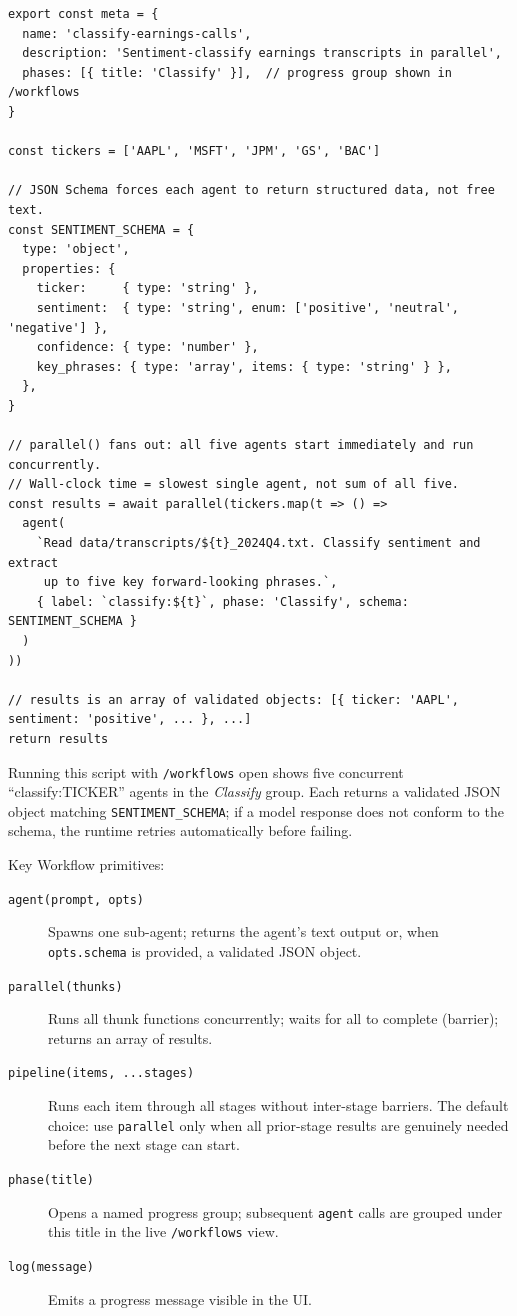 \begin{verbatim}
export const meta = {
  name: 'classify-earnings-calls',
  description: 'Sentiment-classify earnings transcripts in parallel',
  phases: [{ title: 'Classify' }],  // progress group shown in /workflows
}

const tickers = ['AAPL', 'MSFT', 'JPM', 'GS', 'BAC']

// JSON Schema forces each agent to return structured data, not free text.
const SENTIMENT_SCHEMA = {
  type: 'object',
  properties: {
    ticker:     { type: 'string' },
    sentiment:  { type: 'string', enum: ['positive', 'neutral', 'negative'] },
    confidence: { type: 'number' },
    key_phrases: { type: 'array', items: { type: 'string' } },
  },
}

// parallel() fans out: all five agents start immediately and run concurrently.
// Wall-clock time = slowest single agent, not sum of all five.
const results = await parallel(tickers.map(t => () =>
  agent(
    `Read data/transcripts/${t}_2024Q4.txt. Classify sentiment and extract
     up to five key forward-looking phrases.`,
    { label: `classify:${t}`, phase: 'Classify', schema: SENTIMENT_SCHEMA }
  )
))

// results is an array of validated objects: [{ ticker: 'AAPL', sentiment: 'positive', ... }, ...]
return results
\end{verbatim}

Running this script with \texttt{/workflows} open shows five concurrent
``classify:TICKER'' agents in the \emph{Classify} group.  Each returns a
validated JSON object matching \texttt{SENTIMENT\_SCHEMA}; if a model response
does not conform to the schema, the runtime retries automatically before
failing.

Key Workflow primitives:

\begin{description}
  \item[\texttt{agent(prompt, opts)}] Spawns one sub-agent; returns the
        agent's text output or, when \texttt{opts.schema} is provided, a
        validated JSON object.
  \item[\texttt{parallel(thunks)}] Runs all thunk functions concurrently;
        waits for all to complete (barrier); returns an array of results.
  \item[\texttt{pipeline(items, ...stages)}] Runs each item through all
        stages without inter-stage barriers.  The default choice: use
        \texttt{parallel} only when all prior-stage results are genuinely
        needed before the next stage can start.
  \item[\texttt{phase(title)}] Opens a named progress group; subsequent
        \texttt{agent} calls are grouped under this title in the live
        \texttt{/workflows} view.
  \item[\texttt{log(message)}] Emits a progress message visible in the UI.
\end{description}

